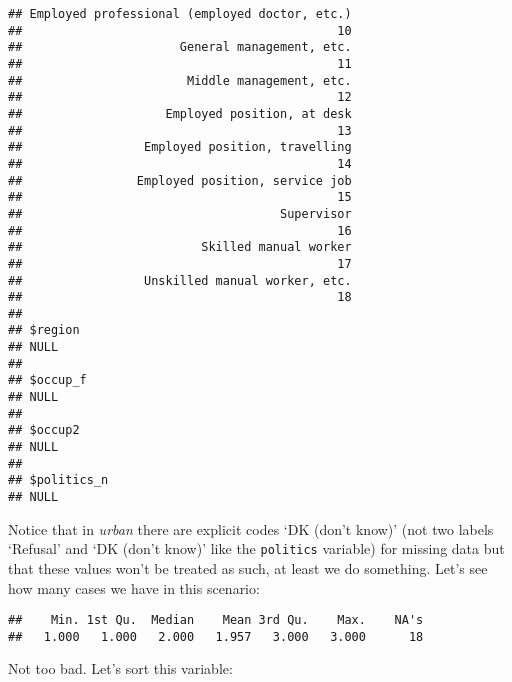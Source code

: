\documentclass[
]{book}
\newenvironment{Shaded}{\begin{snugshade}}{\end{snugshade}}
\newcommand{\FunctionTok}[1]{\textcolor[rgb]{0.13,0.29,0.53}{\textbf{#1}}}
\newcommand{\NormalTok}[1]{#1}
\newcommand{\OtherTok}[1]{\textcolor[rgb]{0.56,0.35,0.01}{#1}}
\newcommand{\SpecialCharTok}[1]{\textcolor[rgb]{0.81,0.36,0.00}{\textbf{#1}}}
\begin{document}
\begin{verbatim}
## Employed professional (employed doctor, etc.) 
##                                            10 
##                      General management, etc. 
##                                            11 
##                       Middle management, etc. 
##                                            12 
##                    Employed position, at desk 
##                                            13 
##                 Employed position, travelling 
##                                            14 
##                Employed position, service job 
##                                            15 
##                                    Supervisor 
##                                            16 
##                         Skilled manual worker 
##                                            17 
##                 Unskilled manual worker, etc. 
##                                            18 
## 
## $region
## NULL
## 
## $occup_f
## NULL
## 
## $occup2
## NULL
## 
## $politics_n
## NULL
\end{verbatim}

Notice that in \emph{urban} there are explicit codes `DK (don't know)' (not two labels `Refusal' and `DK (don't know)' like the \texttt{politics} variable) for missing data but that these values won't be treated as such, at least we do something. Let's see how many cases we have in this scenario:

\begin{Shaded}
\end{Shaded}

\begin{verbatim}
##    Min. 1st Qu.  Median    Mean 3rd Qu.    Max.    NA's 
##   1.000   1.000   2.000   1.957   3.000   3.000      18
\end{verbatim}

Not too bad. Let's sort this variable:

\begin{Shaded}
\end{Shaded}
\end{document}
